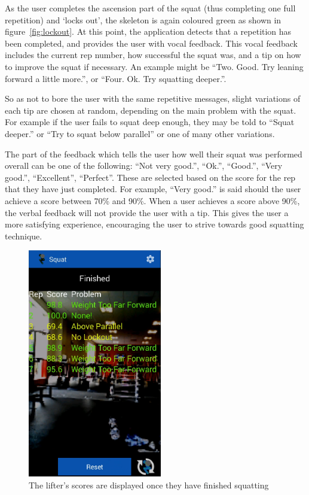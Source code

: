 As the user completes the ascension part of the squat (thus completing one full repetition) and `locks out', the skeleton is again coloured green as shown in figure~\ref{fig:lockout}. At this point, the application detects that a repetition has been completed, and provides the user with vocal feedback. This vocal feedback includes the current rep number, how successful the squat was, and a tip on how to improve the squat if necessary. An example might be ``Two. Good. Try leaning forward a little more.'', or ``Four. Ok. Try squatting deeper.''.

So as not to bore the user with the same repetitive messages, slight variations of each tip are chosen at random, depending on the main problem with the squat. For example if the user fails to squat deep enough, they may be told to ``Squat deeper.'' or ``Try to squat below parallel'' or one of many other variations.

The part of the feedback which tells the user how well their squat was performed overall can be one of the following: ``Not very good.'', ``Ok.'', ``Good.'', ``Very good.'', ``Excellent'', ``Perfect''. These are selected based on the score for the rep that they have just completed. For example, ``Very good.'' is said should the user achieve a score between 70\% and 90\%. When a user achieves a score above 90\%, the verbal feedback will not provide the user with a tip. This gives the user a more satisfying experience, encouraging the user to strive towards good squatting technique.

\begin{figure}[H]
    \centering
	\includegraphics[height=10cm]{application/images/scores}
\caption{The lifter's scores are displayed once they have finished squatting}
\label{fig:scores}
\end{figure}

